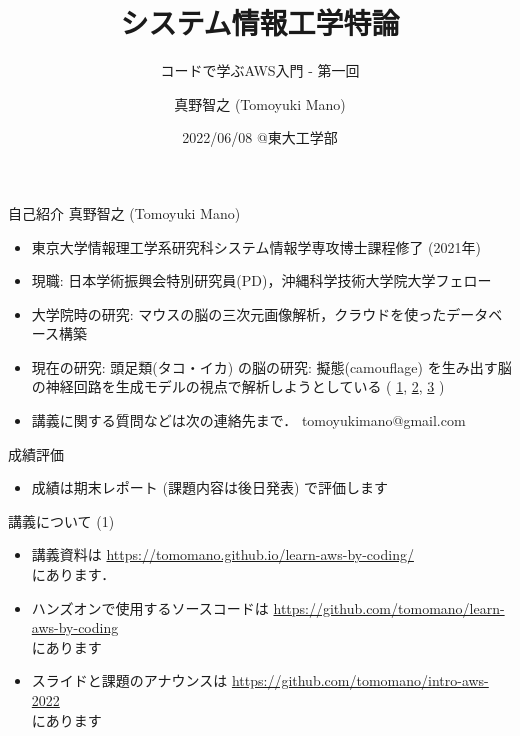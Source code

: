 \documentclass[unicode,11pt]{beamer}
\title{システム情報工学特論}
\subtitle{コードで学ぶAWS入門 - 第一回}
\author{真野智之 (Tomoyuki Mano)}
\institute[OIST]{Okinawa Institute of Science and Technology (OIST)}
\date{2022/06/08 @東大工学部}
\begin{document}
\frame{\titlepage}

\begin{frame}{自己紹介}
真野智之 (Tomoyuki Mano)
\begin{itemize}
    \item 東京大学情報理工学系研究科システム情報学専攻博士課程修了 (2021年)
    \item 現職: 日本学術振興会特別研究員(PD)，沖縄科学技術大学院大学フェロー
    \item 大学院時の研究: マウスの脳の三次元画像解析，クラウドを使ったデータベース構築
    \item 現在の研究: 頭足類(タコ・イカ) の脳の研究: 擬態(camouflage) を生み出す脳の神経回路を生成モデルの視点で解析しようとしている
    (
    \href{https://twitter.com/CephWarden/status/1142083856893263872}{1},
    \href{https://twitter.com/CephWarden/status/1384644335069667334}{2},
    \href{https://twitter.com/CephWarden/status/1232307456346181632}{3}
    )
    \item 講義に関する質問などは次の連絡先まで． tomoyukimano@gmail.com
\end{itemize}
\end{frame}

\begin{frame}{成績評価}
\begin{itemize}
    \item 成績は期末レポート (課題内容は後日発表) で評価します
\end{itemize}
\end{frame}

\begin{frame}{講義について (1)}
\begin{itemize}
    \item 講義資料は
    \url{https://tomomano.github.io/learn-aws-by-coding/}\\
    にあります．
    \item ハンズオンで使用するソースコードは \url{https://github.com/tomomano/learn-aws-by-coding}\\
    にあります
    \item スライドと課題のアナウンスは
    \url{https://github.com/tomomano/intro-aws-2022}\\
    にあります
\end{itemize}
\end{frame}
\end{document}
